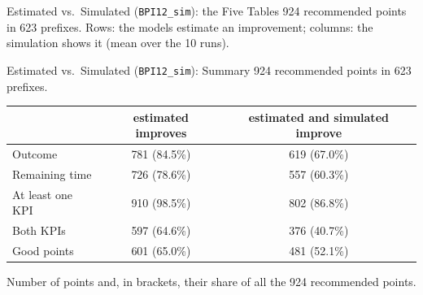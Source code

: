 \documentclass[aspectratio=169]{beamer} %
\begin{document}
\begin{frame}{Estimated vs.\ Simulated (\texttt{BPI12\_sim}): the Five Tables}
  \footnotesize
  924 recommended points in 623 prefixes. Rows: the models estimate an improvement; columns: the
  simulation shows it (mean over the 10 runs).
  \par\vspace{0.3cm}\noindent
  \hfill
  \hfill
  \par\vspace{0.5cm}\noindent\hspace*{\fill}%
  \hspace{0.08\textwidth}%
  \hspace*{\fill}
\end{frame}

\begin{frame}{Estimated vs.\ Simulated (\texttt{BPI12\_sim}): Summary}
  \footnotesize\setlength{\aboverulesep}{0pt}\setlength{\belowrulesep}{1pt}
  924 recommended points in 623 prefixes.
  \begin{center}\setlength{\tabcolsep}{6pt}
  \begin{tabular}{lcc}
    \toprule
     & estimated improves & estimated and simulated improve \\
    \midrule
    Outcome & 781 (84.5\%) & 619 (67.0\%) \\
    Remaining time & 726 (78.6\%) & 557 (60.3\%) \\
    At least one KPI & 910 (98.5\%) & 802 (86.8\%) \\
    Both KPIs & 597 (64.6\%) & 376 (40.7\%) \\
    Good points & 601 (65.0\%) & 481 (52.1\%) \\
    \bottomrule
  \end{tabular}
  \end{center}
  {\scriptsize Number of points and, in brackets, their share of all the 924 recommended points.}
\end{frame}
\end{document}
